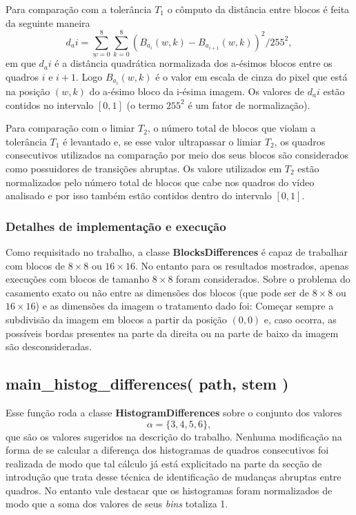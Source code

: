 \documentclass{article}
\begin{document}
Para comparação com a tolerância $T_1$ o cômputo da distância entre blocos é feita da seguinte maneira
\[
d_ai = \sum_{w=0}^{8}\sum_{k=0}^{8}(B_{a_{i}}(w,k) - B_{a_{i+1}}(w,k))^2 / 255^2,
\]
em que $d_ai$ é a distância quadrática normalizada dos a-ésimos blocos entre os quadros $i$ e $i+1$. Logo $B_{a_{i}}(w,k)$ é o valor em escala de cinza do pixel que está na posição $(w,k)$ do a-ésimo bloco da i-ésima imagem. Os valores de $d_ai$ estão contidos no intervalo $[0,1]$ (o termo $255^2$ é um fator de normalização). 

Para comparação com o limiar $T_2$, o número total de blocos que violam a tolerância $T_1$ é levantado e, se esse valor ultrapassar o limiar $T_2$, os quadros consecutivos utilizados na comparação por meio dos seus blocos são considerados como possuidores de transições abruptas. Os valore utilizados em $T_2$ estão normalizados pelo número total de blocos que cabe nos quadros do vídeo analisado e por isso também estão contidos dentro do intervalo $[0,1]$.
%
\subsubsection{Detalhes de implementação e execução}
Como requisitado no trabalho, a classe \textbf{BlocksDifferences} é capaz de trabalhar com blocos de $8\times8$ ou $16\times16$. No entanto para os resultados mostrados, apenas execuções com blocos de tamanho $8\times8$ foram considerados. Sobre o problema do casamento exato ou não entre as dimensões dos blocos (que pode ser de $8\times8$ ou $16\times16$) e as dimensões da imagem o tratamento dado foi: Começar sempre a subdivisão da imagem em blocos a partir da posição $(0,0)$ e, caso ocorra, as possíveis bordas presentes na parte da direita ou na parte de baixo da imagem são desconsideradas.


%
\subsection{main\_histog\_differences( path, stem )}
Esse função roda a classe \textbf{HistogramDifferences} sobre o conjunto dos valores
\[
\alpha = \{3,4,5,6\},
\]
que são os valores sugeridos na descrição do trabalho. Nenhuma modificação na forma de se calcular a diferença dos histogramas de quadros consecutivos foi realizada de modo que tal cálculo já está explicitado na parte da secção de introdução que trata desse técnica de identificação de mudanças abruptas entre quadros. No entanto vale destacar que os histogramas foram normalizados de modo que a soma dos valores de seus \textit{bins} totaliza 1.
%
\end{document}
